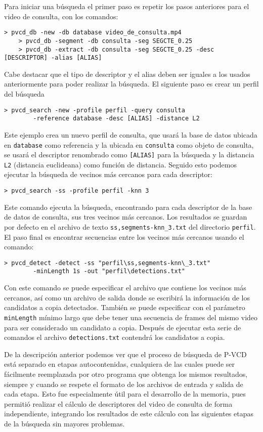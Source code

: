 Para iniciar una búsqueda el primer paso es repetir los pasos anteriores para el video de consulta, con los comandos:
\begin{lstlisting}[style=BashInputStyle]
    > pvcd_db -new -db database video_de_consulta.mp4
    > pvcd_db -segment -db consulta -seg SEGCTE_0.25
    > pvcd_db -extract -db consulta -seg SEGCTE_0.25 -desc [DESCRIPTOR] -alias [ALIAS]
\end{lstlisting}
Cabe destacar que el tipo de descriptor y el alias deben ser iguales a los usados anteriormente para poder realizar la búsqueda. El siguiente paso es crear un perfil del búsqueda
\begin{lstlisting}[style=BashInputStyle]
    > pvcd_search -new -profile perfil -query consulta
        -reference database -desc [ALIAS] -distance L2
\end{lstlisting}
Este ejemplo crea un nuevo perfil de consulta, que usará la base de datos ubicada en \texttt{database} como referencia y la ubicada en \texttt{consulta} como objeto de consulta, se usará el descriptor renombrado como \texttt{[ALIAS]} para la búsqueda y la distancia \texttt{L2} (distancia euclideana) como función de distancia. Seguido esto podemos ejecutar la búsqueda de vecinos más cercanos para cada descriptor:
\begin{lstlisting}[style=BashInputStyle]
    > pvcd_search -ss -profile perfil -knn 3
\end{lstlisting}
Este comando ejecuta la búsqueda, encontrando para cada descriptor de la base de datos de consulta, sus tres vecinos más cercanos. Los resultados se guardan por defecto en el archivo de texto \texttt{ss,segments-knn\_3.txt} del directorio \texttt{perfil}. El paso final es encontrar secuencias entre los vecinos más cercanos usando el comando:
\begin{lstlisting}[style=BashInputStyle]
    > pvcd_detect -detect -ss "perfil\ss,segments-knn\_3.txt"
        -minLength 1s -out "perfil\detections.txt"
\end{lstlisting}
Con este comando se puede especificar el archivo que contiene los vecinos más cercanos, así como un archivo de salida donde se escribirá la información de los candidatos a copia detectados. También se puede especificar con el parámetro \texttt{minLength} mínimo largo que debe tener una secuencia de frames del mismo video para ser considerado un candidato a copia. Después de ejecutar esta serie de comandos el archivo \texttt{detections.txt} contendrá los candidatos a copia.

De la descripción anterior podemos ver que el proceso de búsqueda de P-VCD está separado en etapas autocontenidas, cualquiera de las cuales puede ser fácilmente reemplazada por otro programa que obtenga los mismos resultados, siempre y cuando se respete el formato de los archivos de entrada y salida de cada etapa. Esto fue especialmente útil para el desarrollo de la memoria, pues permitió realizar el cálculo de descriptores del video de consulta de forma independiente, integrando los resultados de este cálculo con las siguientes etapas de la búsqueda sin mayores problemas. 
